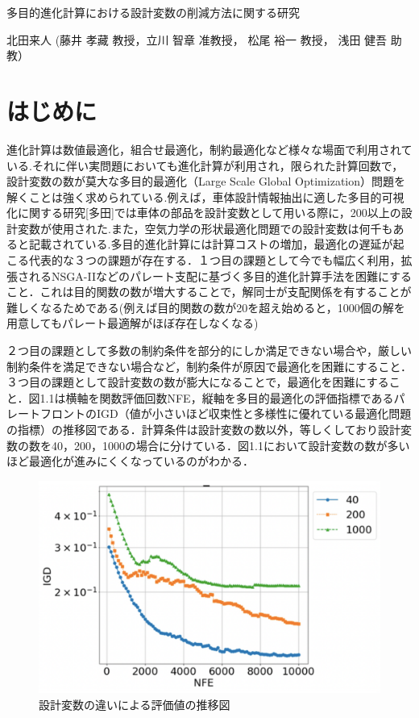 \documentclass[11pt,a4j,notitlepage]{jsarticle}
\begin{document}
\begin{center}
\LARGE{多目的進化計算における設計変数の削減方法に関する研究}
\end{center}
\begin{flushright}
北田来人 (藤井 孝藏 教授，立川 智章 准教授， 松尾 裕一 教授， 浅田 健吾 助教）
\end{flushright}
\vspace{-1.75zh}
\section {はじめに}
\vspace{-1.0zh}
進化計算は数値最適化，組合せ最適化，制約最適化など様々な場面で利用されている.それに伴い実問題においても進化計算が利用され，限られた計算回数で，設計変数の数が莫大な多目的最適化（Large Scale Global Optimization）問題を解くことは強く求められている.例えば，車体設計情報抽出に適した多目的可視化に関する研究[多田]では車体の部品を設計変数として用いる際に，200以上の設計変数が使用された.また，空気力学の形状最適化問題での設計変数は何千もあると記載\cite{Tada}されている.多目的進化計算には計算コストの増加，最適化の遅延が起こる代表的な３つの課題が存在する．１つ目の課題として今でも幅広く利用，拡張されるNSGA-IIなどのパレート支配に基づく多目的進化計算手法を困難にすること．これは目的関数の数が増大することで，解同士が支配関係を有することが難しくなるためである(例えば目的関数の数が20を超え始めると，1000個の解を用意してもパレート最適解がほぼ存在しなくなる\cite{Sato1})

２つ目の課題として多数の制約条件を部分的にしか満足できない場合や，厳しい制約条件を満足できない場合など，制約条件が原因で最適化を困難にすること．３つ目の課題として設計変数の数が膨大になることで，最適化を困難にすること．図1.1は横軸を関数評価回数NFE，縦軸を多目的最適化の評価指標であるパレートフロントのIGD（値が小さいほど収束性と多様性に優れている最適化問題の指標）の推移図である．計算条件は設計変数の数以外，等しくしており設計変数の数を40，200，1000の場合に分けている．図1.1において設計変数の数が多いほど最適化が進みにくくなっているのがわかる．
\begin{figure}[htbp]
\begin{center}
  \includegraphics[width=0.5\linewidth]{fig1.png}
             \setlength{\abovecaptionskip}{0mm}
  \setlength{\belowcaptionskip}{0mm}
    \caption{設計変数の違いによる評価値の推移図}
\label{fig:nsgaiii}
\end{center}
\end{figure}
\end{document}
